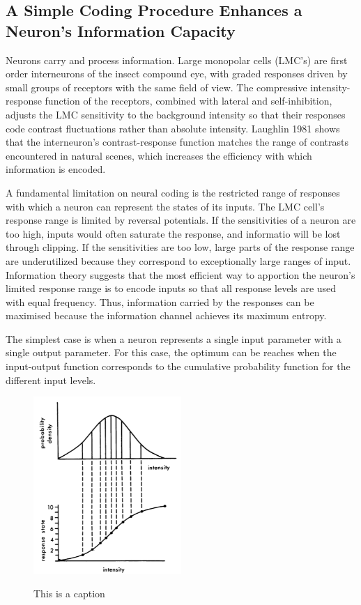 \documentclass[twoside]{article}
\begin{document}
\begin{multicols}{2}
\section{A Simple Coding Procedure Enhances a Neuron's Information Capacity}

Neurons carry and process information. Large monopolar cells (LMC's) are first order interneurons of the insect compound eye, with graded responses driven by small groups of receptors with the same field of view. The compressive intensity-response function of the receptors, combined with lateral and self-inhibition, adjusts the LMC sensitivity to the background intensity so that their responses code contrast fluctuations rather than absolute intensity. Laughlin 1981 shows that the interneuron's contrast-response function matches the range of contrasts encountered in natural scenes, which increases the efficiency with which information is encoded. 

A fundamental limitation on neural coding is the restricted range of responses with which a neuron can represent the states of its inputs. The LMC cell's response range is limited by reversal potentials. If the sensitivities of a neuron are too high, inputs would often saturate the response, and informatio will be lost through clipping. If the sensitivities are too low, large parts of the response range are underutilized because they correspond to exceptionally large ranges of input. Information theory suggests that the most efficient way to apportion the neuron's limited response range is to encode inputs so that all response levels are used with equal frequency. Thus, information carried by the responses can be maximised because the information channel achieves its maximum entropy. 

The simplest case is when a neuron represents a single input parameter with a single output parameter. For this case, the optimum can be reaches when the input-output function corresponds to the cumulative probability function for the different input levels. 

\begin{figure}[H]
	\caption{This is a caption}
	\includegraphics[width=0.5\textwidth]{laughlin1981-fig1}
	\label{fig:laughlin1981-fig1}
\end{figure}




\end{multicols}
\end{document}
